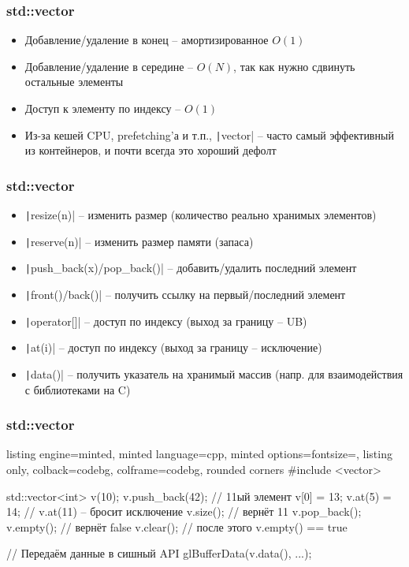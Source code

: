 \documentclass[10pt]{beamer}
\begin{document}
\begin{frame}[fragile]
\frametitle{std::vector}
\begin{itemize}
\item Добавление/удаление в конец -- амортизированное \(O(1)\)
\pause
\item Добавление/удаление в середине -- \(O(N)\), так как нужно сдвинуть остальные элементы
\pause
\item Доступ к элементу по индексу -- \(O(1)\)
\pause
\item Из-за кешей CPU, prefetching'а и т.п., \texttt|vector| -- часто самый эффективный из контейнеров, и почти всегда это хороший дефолт
\end{itemize}
\end{frame}

\begin{frame}[fragile]
\frametitle{std::vector}
\begin{itemize}
\item \texttt|resize(n)| -- изменить размер (количество реально хранимых элементов)
\pause
\item \texttt|reserve(n)| -- изменить размер памяти (запаса)
\pause
\item \texttt|push_back(x)/pop_back()| -- добавить/удалить последний элемент
\pause
\item \texttt|front()/back()| -- получить ссылку на первый/последний элемент
\pause
\item \texttt|operator[]| -- доступ по индексу (выход за границу -- UB)
\pause
\item \texttt|at(i)| -- доступ по индексу (выход за границу -- исключение)
\pause
\item \texttt|data()| -- получить указатель на хранимый массив (напр. для взаимодействия с библиотеками на C)
\end{itemize}
\end{frame}

\begin{frame}[fragile]
\frametitle{std::vector}
\begin{itemize}
\begin{tcblisting}{listing engine=minted, minted language=cpp, minted options={fontsize=\scriptsize}, listing only, colback=codebg, colframe=codebg, rounded corners}
#include <vector>

std::vector<int> v(10);
v.push_back(42); // 11ый элемент
v[0] = 13;
v.at(5) = 14;
// v.at(11) -- бросит исключение
v.size(); // вернёт 11
v.pop_back();
v.empty(); // вернёт false
v.clear(); // после этого v.empty() == true

// Передаём данные в сишный API
glBufferData(v.data(), ...);
\end{tcblisting}
\end{itemize}
\end{frame}
\end{document}
